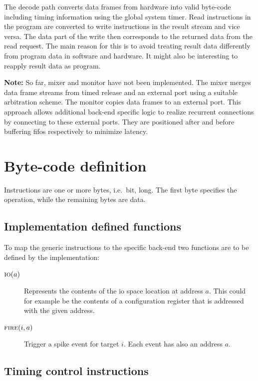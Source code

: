 The decode path converts data frames from hardware into valid byte-code including timing information using the global system timer.
Read instructions in the program are converted to write instructions in the result stream and vice versa.
The data part of the write then corresponds to the returned data from the read request.
The main reason for this is to avoid treating result data differently from program data in software and hardware.
It might also be interesting to reapply result data as program.

\textbf{Note:} So far, mixer and monitor have not been implemented.
The mixer merges data frame streams from timed release and an external port using a suitable arbitration scheme.
The monitor copies data frames to an external port.
This approach allows additional back-end specific logic to realize recurrent connections by connecting to these external ports.
They are positioned after and before buffering \glspl{fifo} respectively to minimize latency.



\section{Byte-code definition}

Instructions are one or more bytes, i.e.\ \unit[8]{bit}, long.
The first byte specifies the operation, while the remaining bytes are data.


\subsection{Implementation defined functions}

To map the generic instructions to the specific back-end two functions are to be defined by the implementation:
\begin{description}
    \item[$\text{\sc{io}}(a)$]
        Represents the contents of the \gls{io} space location at address $a$.
        This could for example be the contents of a configuration register that is addressed with the given address.

    \item[$\text{\sc{fire}}(i, a)$]
        Trigger a spike event for target $i$.
        Each event has also an address $a$.
\end{description}



\subsection{Timing control instructions}

